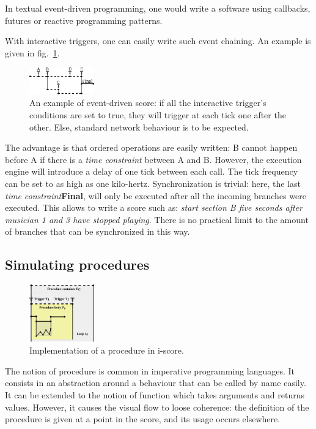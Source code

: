 \documentclass{article}
\newcommand{\timeconstraint}{\textit{time constraint}\xspace}
\begin{document}
In textual event-driven programming, one would write a software 
using callbacks, futures or reactive programming patterns\cite{kambona2013evaluation}. 

With interactive triggers, one can easily write such event chaining.
An example is given in fig.~\ref{fig.event}. 
\begin{figure}[h]
	\centering
	\includegraphics[width=0.25\textwidth]{images/event.eps}
	\caption{An example of event-driven score: if all the interactive trigger's conditions are set to true, they will trigger at each tick one after the other. Else, standard network behaviour is to be expected.}
	\label{fig.event}
\end{figure}
The advantage is that ordered operations are easily written: B cannot happen before A if there is a \timeconstraint between A and B.
However, the execution engine will introduce a delay of one tick between each call.
The tick frequency can be set to as high as one kilo-hertz.
Synchronization is trivial: here, the last \timeconstraint \textbf{Final}, will 
only be executed after all the incoming branches were executed. 
This allows to write a score such as: \emph{start section B five seconds after musician 1 and 3 
have stopped playing}.
There is no practical limit to the amount of branches that can be synchronized in this way.
\subsection{Simulating procedures}
\vspace{-3mm}
\begin{figure}[h]
\centering
\includegraphics[width=0.25\textwidth]{images/function.eps}
\caption{Implementation of a procedure in i-score.}
\label{fig.function}
\end{figure}

The notion of procedure is common in imperative programming languages.
It consists in an abstraction around a behaviour that can be called 
by name easily.
It can be extended to the notion of function which takes arguments 
and returns values.
However, it causes the visual flow to loose coherence: 
the definition of the procedure is given at a point in the score, 
and its usage occurs elsewhere.
\end{document}
